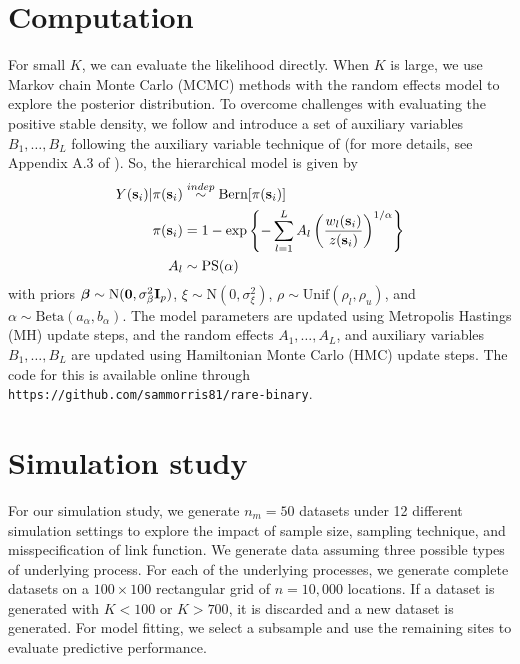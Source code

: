 \documentclass[11pt]{article}
\begin{document}
\section{Computation}\label{rbs:comp}
For small $K$, we can evaluate the likelihood directly.
When $K$ is large, we use Markov chain Monte Carlo (MCMC) methods with the random effects model to explore the posterior distribution.
To overcome challenges with evaluating the positive stable density, we follow \citet{Reich2012} and introduce a set of auxiliary variables $B_1, \ldots, B_L$ following the auxiliary variable technique of \citet{Stephenson2009} (for more details, see Appendix A.3 of \citet{Reich2012}).
So, the hierarchical model is given by
\begin{align}
  Y(\mbox{\bf s}_i) | \pi(\mbox{\bf s}_i) &\stackrel{indep}{\sim} \text{Bern}[\pi(\mbox{\bf s}_i)] \\
    \pi(\mbox{\bf s}_i) &= 1 - \exp \left\{ -\displaystyle \sum_{ l = 1 }^{L} A_l \left( \frac{ w_{l}(\mbox{\bf s}_i) }{ z(\mbox{\bf s}_i) } \right)^{ 1/\alpha} \right\} \nonumber\\
    A_l &\sim \text{PS}(\alpha) \nonumber
\end{align}
with priors $\mbox{\boldmath $\beta$} \sim \text{N}(\mbox{\boldmath $0$}, \sigma^2_\beta \mbox{\bf I}_p )$, $\xi \sim \text{N}(0, \sigma^2_\xi)$, $\rho \sim \text{Unif}(\rho_l, \rho_u)$, and $\alpha \sim \text{Beta}(a_\alpha, b_\alpha)$.
The model parameters are updated using Metropolis Hastings (MH) update steps, and the random effects $A_1, \ldots, A_L$, and auxiliary variables $B_1, \ldots, B_L$ are updated using Hamiltonian Monte Carlo (HMC) update steps.
The code for this is available online through \texttt{https://github.com/sammorris81/rare-binary}.

\section{Simulation study}\label{rbs:sim}

For our simulation study, we generate $n_m = 50$ datasets under 12 different simulation settings to explore the impact of sample size, sampling technique, and misspecification of link function.
We generate data assuming three possible types of underlying process.
For each of the underlying processes, we generate complete datasets on a $100 \times 100$ rectangular grid of $n = 10,000$ locations.
If a dataset is generated with $K < 100$ or $K > 700$, it is discarded and a new dataset is generated.
For model fitting, we select a subsample and use the remaining sites to evaluate predictive performance.
\end{document}
